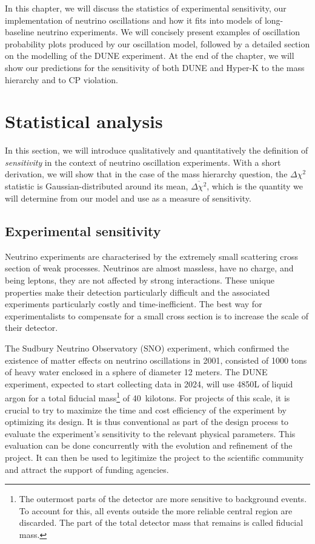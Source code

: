 \label{ch:methods}
In this chapter, we will discuss the statistics of experimental sensitivity,
our implementation of neutrino oscillations and how it fits into models of
long-baseline neutrino experiments.
We will concisely present examples of oscillation probability plots
produced by our oscillation model, followed by a detailed section on the
modelling of the DUNE experiment. At the end of the chapter, we will show our
predictions for the sensitivity of both DUNE and Hyper-K to the mass hierarchy
and to CP violation. 

\section{Statistical analysis}\label{sec:statistics}
In this section, we will introduce qualitatively and quantitatively the definition of
\emph{sensitivity} in the context of neutrino oscillation experiments. With a
short derivation, we will show that in the case of the mass hierarchy question,
the $\Delta \chi^2$ statistic is Gaussian-distributed around its mean,
$\overline{\Delta \chi^2}$, which is the quantity we will determine from our
model and use as a measure of sensitivity.

\subsection{Experimental sensitivity}
Neutrino experiments are characterised by the extremely small scattering cross
section of weak processes. Neutrinos are almost massless, have no charge, and
being leptons, they are not affected by strong interactions. These unique
properties make their detection particularly difficult and the associated
experiments particularly costly and time-inefficient. The best way for
experimentalists to compensate for a small cross section is to increase the scale
of their detector. 

The Sudbury Neutrino Observatory (SNO) experiment, which confirmed
the existence of matter effects on neutrino oscillations in 2001, consisted of 1000
tons of heavy water enclosed in a sphere of diameter 12 meters\cite{thomson}.
The DUNE experiment, expected to start collecting data in 2024, will use 4850L
of liquid argon for a total fiducial mass\footnote{The outermost parts of the
detector are more sensitive to background events. To account for this, all
events outside the more reliable central region are discarded. The part of the
total detector mass that remains is called fiducial mass.} of 40~kilotons\cite{cdr}.
For projects of this scale, it is crucial to try to maximize the time and cost
efficiency of the experiment by optimizing its design. It is thus conventional as part of
the design process to evaluate the experiment's sensitivity to the relevant
physical parameters. This evaluation can be done concurrently with the
evolution and refinement of the project. It can then be used to legitimize
the project to the scientific community and attract the support of funding
agencies.

